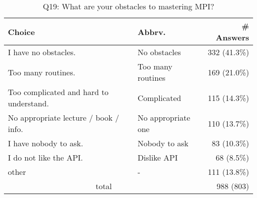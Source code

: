 \begin{table}[htb]%
\begin{center}%
\caption{Q19: What are your obstacles to mastering MPI?}%
\label{tab:Q19-ans}%
\begin{tabular}{l|l|r}%
\hline%
Choice & Abbrv. & \# Answers \\%
\hline%
I have no obstacles. & No obstacles & 332 (41.3\%) \\%
Too many routines. & Too many routines & 169 (21.0\%) \\%
Too complicated and hard to understand. & Complicated & 115 (14.3\%) \\%
No appropriate lecture / book / info. & No appropriate one & 110 (13.7\%) \\%
I have nobody to ask. & Nobody to ask & 83 (10.3\%) \\%
I do not like the API. & Dislike API & 68 (8.5\%) \\%
other & - & 111 (13.8\%) \\%
\hline%
\multicolumn{2}{c}{total} & 988 (803)\\%
\hline%
\end{tabular}%
\end{center}%
\end{table}%
